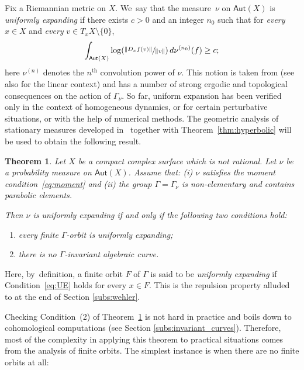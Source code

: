 \documentclass[11pt]{article}
\newcommand{\Psfrac}[2]{(\sfrac{#1}{#2})}
\newcommand{\norm}[1]{{\left\Vert#1\right\Vert}}
\newcommand\Aut{\mathsf{Aut}}
\theoremstyle{plain}
\newtheorem{thm}{Theorem}[section]
\theoremstyle{definition}
\numberwithin{equation}{section}
\begin{document}
Fix a Riemannian
metric on $X$. We~say that the measure~$\nu$ on $\Aut(X)$
is \emph{uniformly expanding} if there exists $c>0$ and an integer $n_0$ such that for \emph{every} $x\in X$ and \emph{every} $v\in T_xX\setminus\{ 0\}$,\vspace*{-3pt}\enlargethispage{.5\baselineskip}
\begin{equation}\label{eq:UE}
\int_{\Aut(X)} \log\Psfrac{\norm{D_xf (v)}}{\norm{v}} \,d\nu^{(n_0)}(f) \geq c;
\end{equation}
here $\nu^{(n)}$ denotes the $n^\mathrm{th}$ convolution power of $\nu$.
This notion is taken from
\cite{chung, dolgopyat-krikorian, liu_thesis, zzhang} (see also \cite{Eskin-Lindenstrauss:RandomWalk, Prohaska-Sert:TAMS} for the linear context) and has a number
of strong ergodic and topological consequences on the action of $\Gamma_\nu$.
So far, uniform expansion has been verified only in the context of homogeneous dynamics, or for certain perturbative situations, or with the help of numerical methods.
The geometric analysis of stationary measures developed in~\cite{stiffness} together with Theorem~\ref{thm:hyperbolic}
will be used to obtain the following result.

\begin{thm}\label{thm:criterion_uniform_expansion_parabolic}
Let $X$ be a compact complex surface which is not rational.
Let $\nu$ be a probability measure on $\Aut(X)$. Assume that:
{\em{(i)}} $\nu$ satisfies the moment condition~\eqref{eq:moment} and {\em{(ii)}} the group
$\Gamma = \Gamma_\nu$ is non-elementary and contains parabolic elements.

Then $\nu$ is uniformly expanding if and only if the following two conditions hold:
\begin{enumerate}
\item\label{thm:criterion_uniform_expansion_parabolic1} every finite $\Gamma$-orbit is uniformly expanding;
\item\label{thm:criterion_uniform_expansion_parabolic2} there is no $\Gamma$-invariant algebraic curve.
\end{enumerate}
\end{thm}

Here, by~definition,
a finite orbit $F$ of $\Gamma$ is said to be \emph{uniformly expanding} if Condition~\eqref{eq:UE}
holds for every $x\in F$. This is the repulsion property alluded to at the end of Section \ref{subs:wehler}.

Checking Condition~(2)
of Theorem~\ref{thm:criterion_uniform_expansion_parabolic} is not hard in practice and boils down to cohomological computations
(see Section \ref{subs:invariant_curves}). Therefore, most of the complexity in applying this theorem to practical situations
comes from the analysis of finite orbits. The simplest instance is when there are no finite orbits at all:
\end{document}
